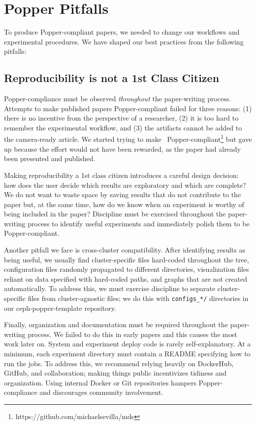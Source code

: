 \section{Popper Pitfalls}
\label{popper-best-practices}

To produce Popper-compliant papers, we needed to change our workflows and
experimental procedures. We have shaped our best practices from the following pitfalls:

\subsection{Reproducibility is not a 1st Class Citizen}
\label{sec:repro}

Popper-compliance must be observed {\it throughout} the paper-writing process.
Attempts to make published papers Popper-compliant failed for three reasons:
(1) there is no incentive from the perspective of a researcher, (2) it is too
hard to remember the experimental workflow, and (3) the artifacts cannot be
added to the camera-ready article. We started trying to
make~\cite{sevilla:sc15-mantle}
Popper-compliant\footnote{https://github.com/michaelsevilla/mds} but gave up
because the effort would not have been rewarded, as the paper had already been
presented and published.

Making reproducibility a 1st class citizen introduces a careful design
decision: how does the user decide which results are exploratory and which are
complete? We do not want to waste space by saving results that do not
contribute to the paper but, at the same time, how do we know when an
experiment is worthy of being included in the paper? Discipline must be
exercised throughout the paper-writing process to identify useful experiments
and immediately polish them to be Popper-compliant.

Another pitfall we face is cross-cluster compatibility. After identifying
results as being useful, we usually find cluster-specific files hard-coded
throughout the tree, configuration files randomly propagated to different
directories, visualization files reliant on data specified with hard-coded
paths, and graphs that are not created automatically. To address this, we must
exercise discipline to separate cluster-specific files from cluster-agnostic
files; we do this with \texttt{configs\_*/} directories in our
ceph-popper-template repository.

Finally, organization and documentation must be required throughout the
paper-writing process. We failed to do this in early papers and this causes the
most work later on. System and experiment deploy code is rarely
self-explanatory. At a minimum, each experiment directory must contain a README
specifying how to run the jobs. To address this, we recommend relying heavily
on DockerHub, GitHub, and collaboration; making things public incentivizes 
tidiness and organization. Using internal Docker or Git repositories hampers
Popper-compliance and discourages community involvement.

